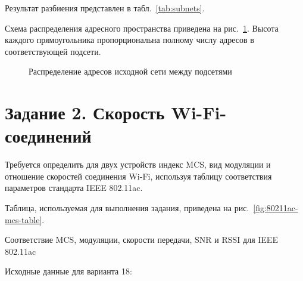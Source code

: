 Результат разбиения представлен в табл.~\ref{tab:subnets}.

\begin{table}[H]
	\centering
	\caption{Результат разбиения исходной сети на подсети}
	\label{tab:subnets}
\end{table}

Схема распределения адресного пространства приведена на
рис.~\ref{fig:subnet-allocation}. Высота каждого прямоугольника
пропорциональна полному числу адресов в соответствующей подсети.

\begin{figure}[H]
	\centering
	\resizebox{\textwidth}{!}{}
	\caption{Распределение адресов исходной сети между подсетями}
	\label{fig:subnet-allocation}
\end{figure}

\newpage
\section{Задание 2. Скорость Wi-Fi-соединений}

Требуется определить для двух устройств индекс MCS, вид модуляции и
отношение скоростей соединения Wi-Fi, используя таблицу соответствия
параметров стандарта IEEE 802.11ac.

Таблица, используемая для выполнения задания, приведена на
рис.~\ref{fig:80211ac-mcs-table}.

{Соответствие MCS, модуляции, скорости передачи, SNR и RSSI для IEEE 802.11ac}
{\label{fig:80211ac-mcs-table}}

Исходные данные для варианта 18:


